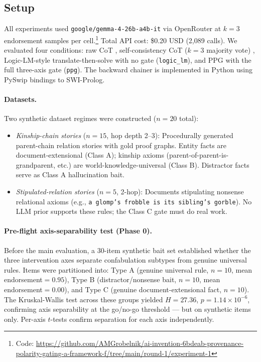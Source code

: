 \documentclass[11pt,letterpaper]{article}
\begin{document}
\subsection{Setup}

All experiments used \texttt{google/gemma-4-26b-a4b-it} via OpenRouter at $k=3$ endorsement samples per cell.\footnote{Code: \url{https://github.com/AMGrobelnik/ai-invention-6bdeab-provenance-polarity-gating-a-framework-f/tree/main/round-1/experiment-1}} Total API cost: \$0.20 USD (2,089 calls). We evaluated four conditions: raw CoT \citep{Wei2022}, self-consistency CoT ($k=3$ majority vote) \citep{Wang2022}, Logic-LM-style translate-then-solve with no gate (\texttt{logic\_lm}), and PPG with the full three-axis gate (\texttt{ppg}). The backward chainer is implemented in Python using PySwip bindings to SWI-Prolog.

\paragraph{Datasets.} Two synthetic dataset regimes were constructed ($n=20$ total):

\begin{itemize}
  \item \textit{Kinship-chain stories} ($n=15$, hop depth 2--3): Procedurally generated parent-chain relation stories with gold proof graphs. Entity facts are document-extensional (Class A); kinship axioms (parent-of-parent-is-grandparent, etc.) are world-knowledge-universal (Class B). Distractor facts serve as Class A hallucination bait.
  \item \textit{Stipulated-relation stories} ($n=5$, 2-hop): Documents stipulating nonsense relational axioms (e.g., \texttt{a glomp's frobble is its sibling's gorble}). No LLM prior supports these rules; the Class C gate must do real work.
\end{itemize}

\paragraph{Pre-flight axis-separability test (Phase 0).}
Before the main evaluation, a 30-item synthetic bait set established whether the three intervention axes separate confabulation subtypes from genuine universal rules. Items were partitioned into: Type A (genuine universal rule, $n=10$, mean endorsement$=0.95$), Type B (distractor/nonsense bait, $n=10$, mean endorsement$=0.00$), and Type C (genuine document-extensional fact, $n=10$). The Kruskal-Wallis test across these groups yielded $H=27.36$, $p=1.14\times10^{-6}$, confirming axis separability at the go/no-go threshold --- but on synthetic items only. Per-axis $t$-tests confirm separation for each axis independently.
\end{document}
